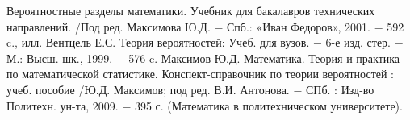 \newpage


\begin{thebibliography}{}
	  Вероятностные разделы математики. Учебник для бакалавров технических направлений. /Под ред. Максимова Ю.Д. $ - $ Спб.: «Иван Федоров», 2001. $ - $ 592 c., илл.
	  Вентцель Е.С. Теория вероятностей: Учеб. для вузов. $ - $ 6-е изд. стер. $ - $ М.: Высш. шк., 1999. $ - $ 576 c. 
	  Максимов Ю.Д. Математика. Теория и практика по математической статистике. Конспект-справочник по теории вероятностей : учеб. пособие /Ю.Д. Максимов; под ред. В.И. Антонова. $ - $ СПб. : Изд-во Политехн. ун-та, 2009. $ - $ 395 с. (Математика в политехническом университете).
\end{thebibliography}